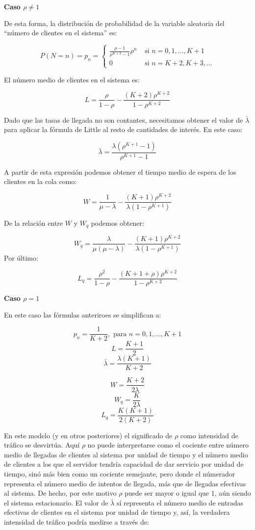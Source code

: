 \documentclass[
]{book}
\theoremstyle{definition}
\theoremstyle{definition}
\theoremstyle{definition}
\theoremstyle{definition}
\theoremstyle{remark}
\begin{document}
\textbf{Caso \(\rho \neq 1\)}

De esta forma, la distribución de probabilidad de la variable aleatoria del ``número de clientes en el sistema'' es:

\[
P(N = n) = p_n =
\begin{cases}
\frac{\rho - 1}{\rho^{K+2} - 1} \rho^n & \text{ si } n = 0, 1,..., K+1\\
0  & \text{ si } n = K+2, K+3,...
\end{cases}
\]

El número medio de clientes en el sistema es:

\[L = \frac{\rho}{1 - \rho} - \frac{(K + 2)\rho^{K+2}}{1 - \rho^{K+2}}\]

Dado que las tasas de llegada no son contantes, necesitamos obtener el valor de \(\bar{\lambda}\) para aplicar la fórmula de Little al resto de cantidades de interés. En este caso:

\[\bar{\lambda} = \frac{\lambda(\rho^{K+1} - 1)}{\rho^{K+1} - 1}\]

A partir de esta expresión podemos obtener el tiempo medio de espera de los clientes en la cola como:

\[W = \frac{1}{\mu - \lambda} - \frac{(K+1)\rho^{K+2}}{\lambda(1-\rho^{K+1})}\]

De la relación entre \(W\) y \(W_q\) podemos obtener:

\[W_q = \frac{\lambda}{\mu(\mu - \lambda)} - \frac{(K+1)\rho^{K+2}}{\lambda(1-\rho^{K+1})}\]
Por último:

\[L_q =  \frac{\rho^2}{1 - \rho} - \frac{(K + 1 + \rho)\rho^{K+2}}{1 - \rho^{K+2}}\]

\textbf{Caso \(\rho = 1\)}

En este caso las fórmulas anteriroes se simplifican a:

\[p_n = \frac{1}{K+2}, \text{ para } n = 0, 1,...,K + 1\]
\[L = \frac{K + 1}{2}\]
\[\bar{\lambda} = \frac{\lambda(K + 1)}{K + 2}\]

\[W = \frac{K + 2}{2\lambda}\]
\[W_q = \frac{K}{2\lambda}\]
\[L_q = \frac{K(K + 1)}{2(K+2)}\]

En este modelo (y en otros posteriores) el significado de \(\rho\) como intensidad de tráfico se desvirtúa. Aquí \(\rho\) no puede interpretarse como el cociente entre número medio de llegadas de clientes al sistema por unidad de tiempo y el número medio de clientes a los que el servidor tendría capacidad de dar servicio por unidad de tiempo, sinó más bien como un cociente semejante, pero donde el númerador representa el número medio de intentos de llegada, más que de llegadas efectivas al sistema. De hecho, por este motivo \(\rho\) puede ser mayor o igual que 1, aún siendo el sistema estacionario.
El valor de \(\bar{\lambda}\) sí representa el número medio de entradas efectivas de clientes en el sistema por unidad de tiempo y, así, la verdadera intensidad de tráfico podría medirse a través de:
\end{document}
